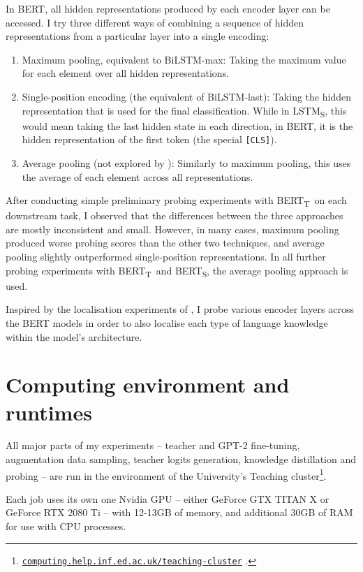 \documentclass[bsc,frontabs,twoside,singlespacing,parskip,deptreport]{infthesis}
\def\BERTT{BERT\textsubscript{T}}
\def\BERTS{BERT\textsubscript{S}}
\def\LSTMS{LSTM\textsubscript{S}}
\newcommand\rurl[1]{%
  \href{https://#1}{\nolinkurl{#1}}%
}
\begin{document}
{{{      In BERT, all hidden representations produced by each encoder layer can be accessed. I try three different ways of combining a sequence of hidden representations from a particular layer into a single encoding:
      \begin{enumerate}
        \item Maximum pooling, equivalent to BiLSTM-max: Taking the maximum value for each element over all hidden representations.
        \item Single-position encoding (the equivalent of BiLSTM-last): Taking the hidden representation that is used for the final classification. While in \LSTMS, this would mean taking the last hidden state in each direction, in BERT, it is the hidden representation of the first token (the special \verb|[CLS]|).
        \item Average pooling (not explored by \citeauthor{Conneau_2018}): Similarly to maximum pooling, this uses the average of each element across all representations.
      \end{enumerate}
      After conducting simple preliminary probing experiments with \BERTT~on each downstream task, I observed that the differences between the three approaches are mostly inconsistent and small. However, in many cases, maximum pooling produced worse probing scores than the other two techniques, and average pooling slightly outperformed single-position representations. In all further probing experiments with \BERTT~and \BERTS, the average pooling approach is used.

      Inspired by the localisation experiments of \citet{Tenney_2019b}, I probe various encoder layers across the BERT models in order to also localise each type of language knowledge within the model's architecture.
    }
  }

  \section{Computing environment and runtimes}{
    All major parts of my experiments -- teacher and GPT-2 fine-tuning, augmentation data sampling, teacher logits generation, knowledge distillation and probing -- are run in the environment of the University's Teaching cluster\footnote{\rurl{computing.help.inf.ed.ac.uk/teaching-cluster}.}.

    Each job uses its own one Nvidia GPU -- either GeForce GTX TITAN X or GeForce RTX 2080 Ti -- with 12-13GB of memory, and additional 30GB of RAM for use with CPU processes.

}}
\end{document}
